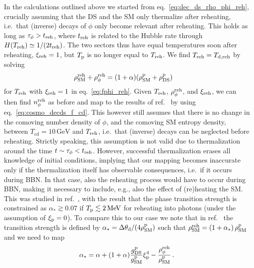 	In the calculations outlined above we started from eq.~\eqref{eq:dec_ds_rho_phi_reh}, crucially assuming that the \ac{DS} and the \ac{SM} only thermalize  after reheating, i.e.~that (inverse) decays of $\phi$ only become relevant after reheating. This holds as long as $\tau_\phi > t_{\text{reh}}$, where $t_{\text{reh}}$ is related to the Hubble rate through $H(T_{\text{reh}}) \simeq 1/(2 t_{\text{reh}})$. The two sectors thus have equal temperatures soon after reheating, $\xi_{\text{reh}} = 1$, but $T_{\text{p}}$ is no longer equal to $T_{\text{reh}}$. We find $T_{\text{reh}} = T_{\mathrm{d,reh}}$ by solving
	\begin{align}
		\rho_{\text{SM}}^{\text{reh}} + \rho_\phi^{\text{reh}} &= (1 + \alpha) (\rho_{\text{SM}}^{\text{p}} + \rho_{\text{DS}}^{\text{p}}) \label{eq:cosmo_ds_dec_implicit_T_SM_reh}
	\end{align}
	for $T_{\text{reh}}$ with $\xi_{\text{reh}} = 1$ in eq.~\eqref{eq:fphi_reh}. Given $T_{\text{reh}}$, $\rho_\phi^{\text{reh}}$, and $\xi_{\text{reh}}$,  we can then find $n_\phi^{\text{reh}}$ as before and map to the results of ref.~\cite{Depta:2020zbh} by using eq.~\eqref{eq:cosmo_decds_f_cd}. This however still assumes that there is no change in the comoving number density of $\phi$, and the comoving \ac{SM} entropy density, between $T_\mathrm{cd} = 10 \, \mathrm{GeV}$ and $T_{\text{reh}}$, i.e.~that (inverse) decays can be neglected before reheating. Strictly speaking, this assumption is not valid due to thermalization around the time $t \sim \tau_\phi < t_{\text{reh}}$. However, successful thermalization erases all knowledge of initial conditions, implying that our mapping becomes inaccurate only if the thermalization itself has observable consequences, i.e.~if it occurs during \ac{BBN}. In that case, also the reheating process would  have to occur during \ac{BBN}, making it necessary to include, e.g., also the effect of (re)heating the \ac{SM}. This was studied in ref.~\cite{Bai:2021ibt}, with the result that the phase transition strength is constrained as $\alpha_* \gtrsim 0.07$ if $T_{\text{p}} \lesssim 2 \, \mathrm{MeV}$ for reheating into photons (under the assumption of $\xi_{\text{p}} = 0$). To compare this to our case we note that in ref.~\cite{Bai:2021ibt} the transition strength is defined by $\alpha_* = \Delta \theta_\text{d} / (4 \rho_{\text{SM}}^{\text{p}})$ such that $\rho_{\text{SM}}^{\text{reh}} = (1 + \alpha_*) \, \rho_{\text{SM}}^{\text{p}}$ and we need to map
	\begin{align}
		\alpha_* = \alpha + (1 + \alpha) \frac{g_{\text{DS}}^{\text{p}}}{g_{\text{SM}}^{\text{p}}} \xi_{\text{p}}^4 - \frac{\rho_\phi^{\text{reh}}}{\rho_{\text{SM}}^{\text{p}}}\,. \label{eq:alphaast}
	\end{align}
